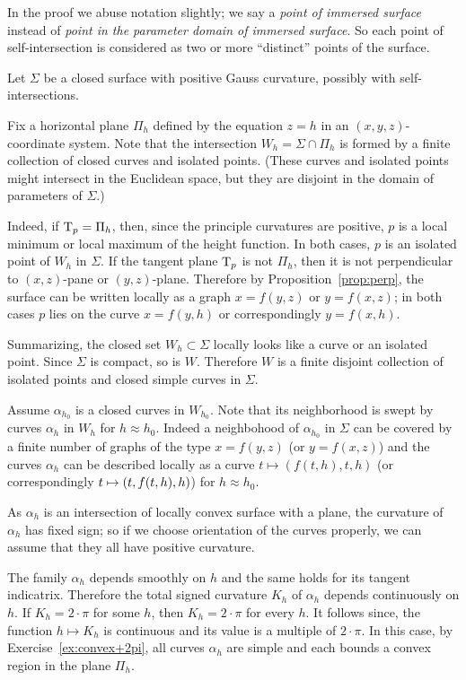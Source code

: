 In the proof we abuse notation slightly;
we say a \emph{point of immersed surface} instead of \emph{point in the parameter domain of immersed surface}.
So each point of self-intersection is considered as two or more ``distinct'' points of the surface.

Let $\Sigma$ be a closed surface with positive Gauss curvature, possibly with self-intersections. 

Fix a horizontal plane $\Pi_h$ defined by the equation $z=h$ in an $(x,y,z)$-coordinate system.
Note that the intersection $W_h=\Sigma\cap\Pi_h$ is formed by a finite collection of closed curves and isolated points.
(These curves and isolated points might intersect in the Euclidean space, but they are disjoint in the domain of parameters of $\Sigma$.)

Indeed, if $\mathrm{T}_p=\Pi_h$, then, since the principle curvatures are positive, $p$ is a local minimum or local maximum of the height function.
In both cases, $p$ is an isolated point of $W_h$ in $\Sigma$.
If the tangent plane $\mathrm{T}_p$ is not $\Pi_h$, then it is not perpendicular to $(x,z)$-pane or $(y,z)$-plane.
Therefore by Proposition~\ref{prop:perp}, the surface can be written locally as a graph $x=f(y,z)$ or $y=f(x,z)$;
in both cases $p$ lies on the curve $x=f(y,h)$ or correspondingly $y=f(x,h)$.

Summarizing, the closed set $W_h\subset \Sigma$ locally looks like a curve or an isolated point.
Since $\Sigma$ is compact, so is $W$.
Therefore $W$ is a finite disjoint collection of isolated points and closed simple curves in $\Sigma$.

Assume $\alpha_{h_0}$ is a closed curves in $W_{h_0}$.
Note that its neighborhood is swept by curves $\alpha_h$ in $W_{h}$ for $h\approx h_0$.
Indeed a neighbohood of $\alpha_{h_0}$ in $\Sigma$ can be covered by a finite number of graphs of the type $x=f(y,z)$ (or $y=f(x,z)$) and the curves $\alpha_h$ can be described locally as a curve $t\mapsto (f(t,h),t,h)$ (or correspondingly $t\z\mapsto(t,f(t,h),h)$) for $h\approx h_0$.

As $\alpha_h$ is an intersection of locally convex surface with a plane,
the curvature of $\alpha_h$ has fixed sign;
so if we choose orientation of the curves properly, we can assume that they all have positive curvature.

The family $\alpha_h$ depends smoothly on $h$ and the same holds for its tangent indicatrix.
Therefore the total signed curvature $K_h$ of $\alpha_h$ depends continuously on $h$.
If $K_h=2\cdot\pi$ for some $h$, then $K_h=2\cdot\pi$ for every $h$.
It follows since, the function $h\mapsto K_h$ is continuous and its value is a multiple of $2\cdot\pi$.
In this case, by Exercise~\ref{ex:convex+2pi}, all curves $\alpha_h$ are simple and each bounds a convex region in the plane $\Pi_h$.

